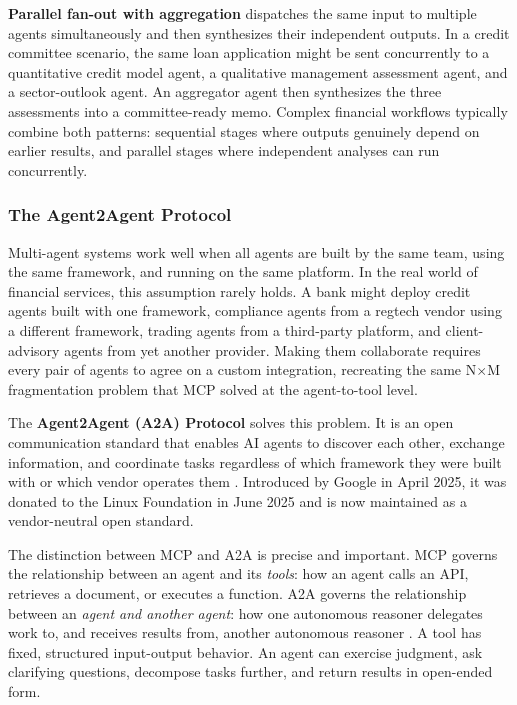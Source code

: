 \documentclass{article}
\begin{document}
\textbf{Parallel fan-out with aggregation} dispatches the same input to multiple agents simultaneously and then synthesizes their independent outputs. In a credit committee scenario, the same loan application might be sent concurrently to a quantitative credit model agent, a qualitative management assessment agent, and a sector-outlook agent. An aggregator agent then synthesizes the three assessments into a committee-ready memo. Complex financial workflows typically combine both patterns: sequential stages where outputs genuinely depend on earlier results, and parallel stages where independent analyses can run concurrently.

\subsubsection{The Agent2Agent Protocol}
\label{sec:a2a}

Multi-agent systems work well when all agents are built by the same team, using the same framework, and running on the same platform. In the real world of financial services, this assumption rarely holds. A bank might deploy credit agents built with one framework, compliance agents from a regtech vendor using a different framework, trading agents from a third-party platform, and client-advisory agents from yet another provider. Making them collaborate requires every pair of agents to agree on a custom integration, recreating the same N$\times$M fragmentation problem that MCP solved at the agent-to-tool level.

The \textbf{Agent2Agent (A2A) Protocol} solves this problem. It is an open communication standard that enables AI agents to discover each other, exchange information, and coordinate tasks regardless of which framework they were built with or which vendor operates them \cite{googlea2a2025}. Introduced by Google in April 2025, it was donated to the Linux Foundation in June 2025 and is now maintained as a vendor-neutral open standard.

The distinction between MCP and A2A is precise and important. MCP governs the relationship between an agent and its \textit{tools}: how an agent calls an API, retrieves a document, or executes a function. A2A governs the relationship between an \textit{agent and another agent}: how one autonomous reasoner delegates work to, and receives results from, another autonomous reasoner \cite{googlea2a2025}. A tool has fixed, structured input-output behavior. An agent can exercise judgment, ask clarifying questions, decompose tasks further, and return results in open-ended form.
\end{document}

